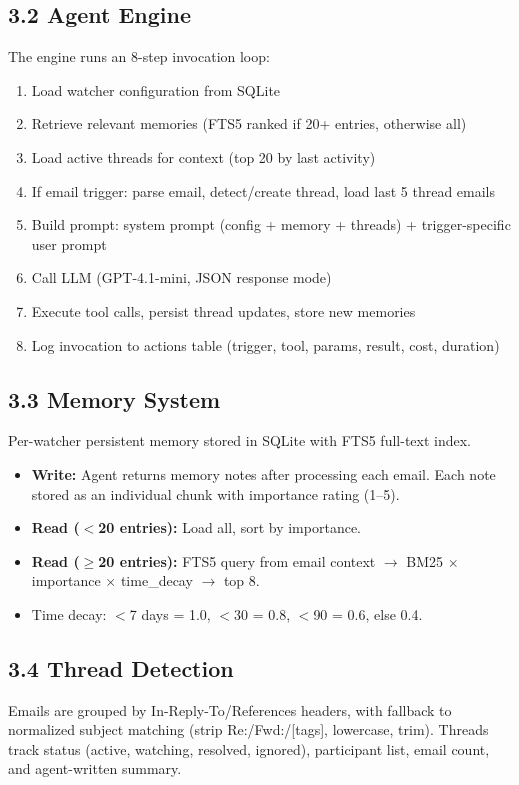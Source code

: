 \documentclass[10pt]{article}
\begin{document}
\subsection*{3.2 Agent Engine}
The engine runs an 8-step invocation loop:
\begin{enumerate}[nosep]
  \item Load watcher configuration from SQLite
  \item Retrieve relevant memories (FTS5 ranked if 20+ entries, otherwise all)
  \item Load active threads for context (top 20 by last activity)
  \item If email trigger: parse email, detect/create thread, load last 5 thread emails
  \item Build prompt: system prompt (config + memory + threads) + trigger-specific user prompt
  \item Call LLM (GPT-4.1-mini, JSON response mode)
  \item Execute tool calls, persist thread updates, store new memories
  \item Log invocation to actions table (trigger, tool, params, result, cost, duration)
\end{enumerate}

\subsection*{3.3 Memory System}
Per-watcher persistent memory stored in SQLite with FTS5 full-text index.
\begin{itemize}[nosep]
  \item \textbf{Write:} Agent returns memory notes after processing each email. Each note stored as an individual chunk with importance rating (1--5).
  \item \textbf{Read ($<$20 entries):} Load all, sort by importance.
  \item \textbf{Read ($\geq$20 entries):} FTS5 query from email context $\rightarrow$ BM25 $\times$ importance $\times$ time\_decay $\rightarrow$ top 8.
  \item Time decay: $<$7 days = 1.0, $<$30 = 0.8, $<$90 = 0.6, else 0.4.
\end{itemize}

\subsection*{3.4 Thread Detection}
Emails are grouped by In-Reply-To/References headers, with fallback to normalized subject matching
(strip Re:/Fwd:/[tags], lowercase, trim). Threads track status (active, watching, resolved, ignored),
participant list, email count, and agent-written summary.
\end{document}
